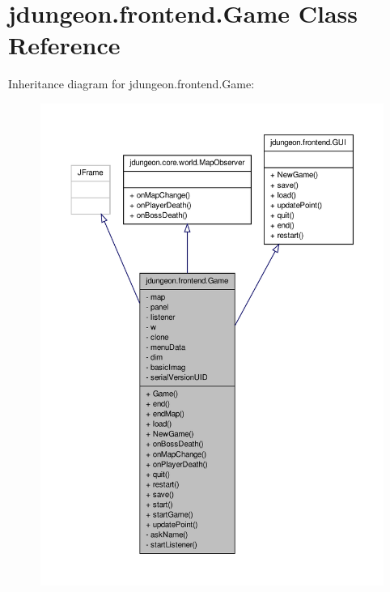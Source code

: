\hypertarget{classjdungeon_1_1frontend_1_1_game}{
\section{jdungeon.frontend.Game Class Reference}
\label{classjdungeon_1_1frontend_1_1_game}
}


Inheritance diagram for jdungeon.frontend.Game:
\nopagebreak
\begin{figure}[H]
\begin{center}
\leavevmode
\includegraphics[width=400pt]{classjdungeon_1_1frontend_1_1_game__inherit__graph}
\end{center}
\end{figure}


